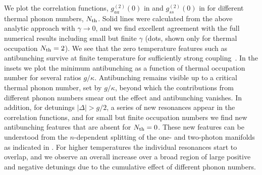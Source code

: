 We plot the correlation functions,
$g^{(2)}_{aa}(0)$ in  and $g^{(2)}_{ss}(0)$ in
 for different thermal phonon numbers, $N_{\rm th}$. 
Solid lines were calculated from the above
analytic approach with $\gamma \rightarrow 0$, 
and we find excellent agreement with
the full numerical results including small but finite
$\gamma$ (dots, shown only for
thermal occupation $N_{\rm th} = 2$).
We see that the zero temperature
features such as antibunching
survive at finite temperature for sufficiently strong coupling~\cite{Stannigel2012}.
In the insets we plot the minimum antibunching
as a function of thermal occupation number for
several ratios $g / \kappa$. 
Antibunching remains visible up
to a critical thermal phonon number, 
set by $g/\kappa$, 
beyond which the contributions from 
different phonon numbers smear out the effect
and antibunching vanishes.
In addition, for detunings $|\Delta|>g/2$, a series of new
resonances appear in the correlation functions, 
and for small but finite occupation numbers we  find
new antibunching features that are absent for $N_{\rm th}=0$.
These new features  can be understood from the $n$-dependent splitting of the
one- and two-photon manifolds as indicated in .
For higher temperatures the individual resonances start to overlap, and we
observe an overall increase over a broad region of large positive and negative
detunings due to the cumulative effect of different phonon numbers.



